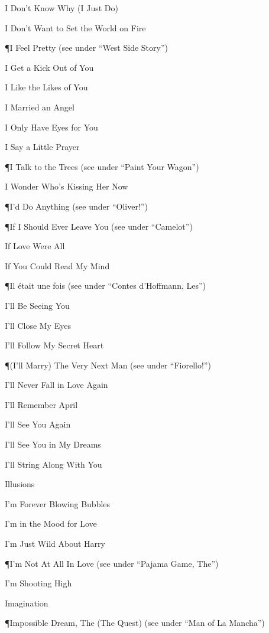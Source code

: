 \N I Don't Know Why (I Just Do)

\N I Don't Want to Set the World on Fire

\P I Feel Pretty
\nobreak
\T (see under ``West Side Story'')

\N I Get a Kick Out of You

\N I Like the Likes of You

\N I Married an Angel

\N I Only Have Eyes for You

\N I Say a Little Prayer

\P I Talk to the Trees
\nobreak
\T (see under ``Paint Your Wagon'')

\N I Wonder Who's Kissing Her Now

\P I'd Do Anything
\nobreak
\T (see under ``Oliver!'')

\P If I Should Ever Leave You
\nobreak
\T (see under ``Camelot'')

\N If Love Were All

\N If You Could Read My Mind

\P Il {\'e}tait une fois
\nobreak
\T (see under ``Contes d'Hoffmann, Les'')

\N I'll Be Seeing You

\N I'll Close My Eyes

\N I'll Follow My Secret Heart

\P (I'll Marry) The Very Next Man
\nobreak
\T (see under ``Fiorello!'')

\N I'll Never Fall in Love Again

\N I'll Remember April

\N I'll See You Again

\N I'll See You in My Dreams

\N I'll String Along With You

\N Illusions

\N I'm Forever Blowing Bubbles

\N {}

\N I'm in the Mood for Love

\N I'm Just Wild About Harry

\P I'm Not At All In Love
\nobreak
\T (see under ``Pajama Game, The'')

\N I'm Shooting High

\N Imagination

\P Impossible Dream, The (The Quest)
\nobreak
\T (see under ``Man of La Mancha'')

